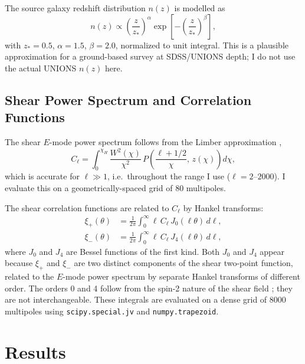 \documentclass[12pt, a4paper]{article}
\begin{document}
The source galaxy redshift distribution $n(z)$ is modelled as
\begin{equation}
    n(z) \propto \left(\frac{z}{z_*}\right)^\alpha
    \exp\!\left[-\left(\frac{z}{z_*}\right)^\beta\right],
\end{equation}
with $z_* = 0.5$, $\alpha = 1.5$, $\beta = 2.0$, normalized to unit integral.
This is a plausible approximation for a ground-based survey at SDSS/UNIONS depth;
I do not use the actual UNIONS $n(z)$ here.
 
\subsection{Shear Power Spectrum and Correlation Functions}
 
The shear $E$-mode power spectrum follows from the Limber approximation
\citep{Limber1953,Loverde2008},
\begin{equation}
    C_\ell = \int_0^{\chi_H}
    \frac{W^2(\chi)}{\chi^2}\,P\!\left(\frac{\ell+1/2}{\chi},\,z(\chi)\right)d\chi,
    \label{eq:limber}
\end{equation}
which is accurate for $\ell \gg 1$, i.e.\ throughout the range I use
($\ell = 2$--$2000$). I evaluate this on a geometrically-spaced grid of 80
multipoles.
 
The shear correlation functions are related to $C_\ell$ by Hankel transforms:
\begin{align}
    \xi_+(\theta) &= \frac{1}{2\pi}\int_0^\infty \ell\,C_\ell\,J_0(\ell\theta)\,d\ell,
    \label{eq:xip}\\
    \xi_-(\theta) &= \frac{1}{2\pi}\int_0^\infty \ell\,C_\ell\,J_4(\ell\theta)\,d\ell,
    \label{eq:xim}
\end{align}
where $J_0$ and $J_4$ are Bessel functions of the first kind. Both $J_0$ and $J_4$ appear because $\xi_+$ and $\xi_-$ are two distinct 
components of the shear two-point function, related to the $E$-mode power 
spectrum by separate Hankel transforms of different order. The orders 0 and 
4 follow from the spin-2 nature of the shear field 
\citep[eq.~2.69]{Bartelmann2001}; they are not interchangeable. These integrals are evaluated on a dense
grid of $8000$ multipoles using \texttt{scipy.special.jv} and
\texttt{numpy.trapezoid}.
 
\section{Results}
 
\end{document}
